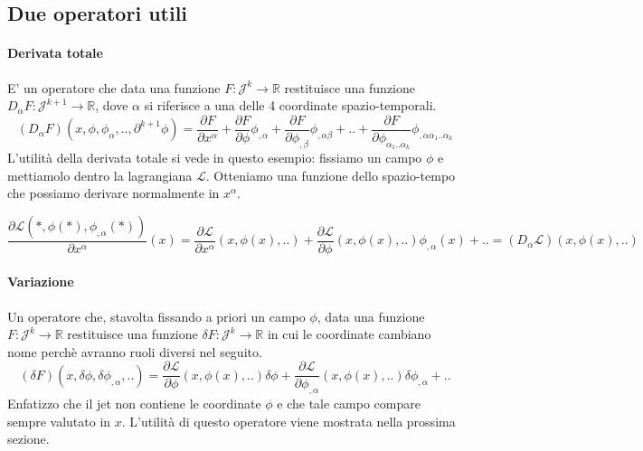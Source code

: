 \documentclass[]{article}
\begin{document}
\subsection*{Due operatori utili}
\paragraph{Derivata totale}
E' un operatore che data una funzione $F : \mathcal{J}^k \rightarrow \mathbb{R}$ restituisce una funzione $D_\alpha F : \mathcal{J}^{k+1} \rightarrow \mathbb{R}$, dove $\alpha$ si riferisce a una delle 4 coordinate spazio-temporali.
$$(D_\alpha F) (x, \phi, \phi_{\alpha}, .., \partial^{k+1}\phi) = \dfrac{\partial F}{\partial x^\alpha} + \dfrac{\partial F}{\partial \phi} \phi_{,\alpha} + \dfrac{\partial F}{\partial \phi_{,\beta}} \phi_{,\alpha \beta} + .. + \dfrac{\partial F}{\partial \phi_{\alpha_1 .. \alpha_k}} \phi_{,\alpha \alpha_1 .. \alpha_k}$$
L'utilità della derivata totale si vede in questo esempio: fissiamo un campo $\phi$ e mettiamolo dentro la lagrangiana $\mathcal{L}$. Otteniamo una funzione dello spazio-tempo che possiamo derivare normalmente in $x^\alpha$.

$$\dfrac{\partial \mathcal{L}(*, \phi(*), \phi_{,\alpha}(*))}{\partial x^\alpha} (x) = 
\dfrac{\partial \mathcal{L}}{\partial x^\alpha}(x, \phi(x), ..) + \dfrac{\partial \mathcal{L}}{\partial \phi}(x, \phi(x), ..) \phi_{,\alpha}(x) + .. = 
(D_\alpha \mathcal{L}) (x, \phi(x), ..)$$
\paragraph{Variazione}
Un operatore che, stavolta fissando a priori un campo $\phi$, data una funzione $F : \mathcal{J}^k \rightarrow \mathbb{R}$ restituisce una funzione $\delta F : \mathcal{J}^k \rightarrow \mathbb{R}$ in cui le coordinate cambiano nome perchè avranno ruoli diversi nel seguito.
$$(\delta F)(x, \delta \phi, \delta \phi_{,\alpha}, ..) = \dfrac{\partial \mathcal{L}}{\partial \phi}(x, \phi(x), ..) \delta \phi + \dfrac{\partial \mathcal{L}}{\partial \phi_{,\alpha}}(x, \phi(x), ..) \delta \phi_{,\alpha} + ..$$
Enfatizzo che il jet non contiene le coordinate $\phi$ e che tale campo compare sempre valutato in $x$. L'utilità di questo operatore viene mostrata nella prossima sezione.
\end{document}
